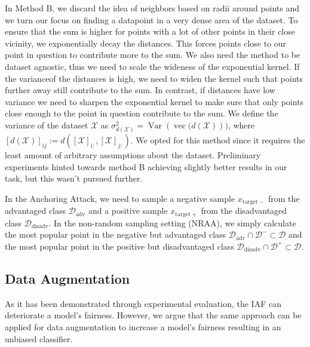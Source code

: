 In Method B, we discard the idea of neighbors based on radii around points and we turn our focus on finding a datapoint in a very dense area of the dataset. To ensure that the sum is higher for points with a lot of other points in their close vicinity, we exponentially decay the distances. This forces points close to our point in question to contribute more to the sum. We also need the method to be dataset agnostic, thus we need to scale the wideness of the exponential kernel. If the variance\footnotemark of the distances is high, we need to widen the kernel such that points further away still contribute to the sum. In contrast, if distances have low variance we need to sharpen the exponential kernel to make sure that only points close enough to the point in question contribute to the sum. We define the variance of the dataset $\mathcal{X}$ as $\sigma_{d(\mathcal{X})}^2=\operatorname{Var}\left(\operatorname{vec}(d(\mathcal{X})\right))$, where  $\left[d(\mathcal{X})\right]_{i j}:=d\left(\left[\mathcal{X}\right]_{i :}, \left[\mathcal{X}\right]_{j :}\right)$. We opted for this method since it requires the least amount of arbitrary assumptions about the dataset. Preliminary experiments hinted towards method B achieving slightly better results in our task, but this wasn't pursued further.

In the Anchoring Attack, we need to sample a negative sample $x_{\mathrm{target-}}$ from the advantaged class $\mathcal{D}_{\mathrm{adv}}$ and a positive sample $x_{\mathrm{target+}}$ from the disadvantaged class $\mathcal{D}_{\mathrm{disadv}}$. In the non-random sampling setting (NRAA), we simply calculate the most popular point in the negative but advantaged class $\mathcal{D}_{\mathrm{adv}}\cap\mathcal{D}^-\subset \mathcal{D}$ and the most popular point in the positive but disadvantaged class $\mathcal{D}_{\mathrm{disadv}}\cap\mathcal{D}^+\subset \mathcal{D}$.


\subsection{Data Augmentation}
\label{appendix:data_augmetation}
As it has been demonstrated through experimental evaluation, the IAF can deteriorate a model's fairness. However, we argue that the same approach can be applied for data augmentation to increase a model's fairness resulting in an unbiased classifier.


